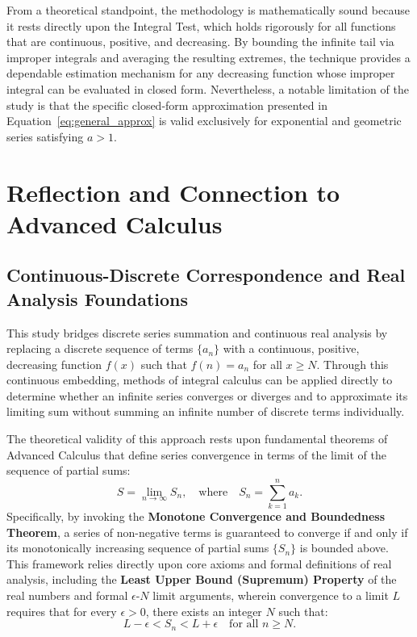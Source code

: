 \documentclass[11pt, a4paper]{article}
\begin{document}
From a theoretical standpoint, the methodology is mathematically sound because it rests directly upon the Integral Test, which holds rigorously for all functions that are continuous, positive, and decreasing. By bounding the infinite tail via improper integrals and averaging the resulting extremes, the technique provides a dependable estimation mechanism for any decreasing function whose improper integral can be evaluated in closed form. Nevertheless, a notable limitation of the study is that the specific closed-form approximation presented in Equation~\eqref{eq:general_approx} is valid exclusively for exponential and geometric series satisfying $a > 1$.

\section{Reflection and Connection to Advanced Calculus}

\subsection{Continuous-Discrete Correspondence and Real Analysis Foundations}

This study bridges discrete series summation and continuous real analysis by replacing a discrete sequence of terms $\{a_{n}\}$ with a continuous, positive, decreasing function $f(x)$ such that $f(n) = a_{n}$ for all $x \ge N$. Through this continuous embedding, methods of integral calculus can be applied directly to determine whether an infinite series converges or diverges and to approximate its limiting sum without summing an infinite number of discrete terms individually.

The theoretical validity of this approach rests upon fundamental theorems of Advanced Calculus that define series convergence in terms of the limit of the sequence of partial sums:
\begin{equation}
    S = \lim_{n \to \infty} S_{n}, \quad \text{where} \quad S_{n} = \sum_{k=1}^{n} a_{k}.
\end{equation}
Specifically, by invoking the \textbf{Monotone Convergence and Boundedness Theorem}, a series of non-negative terms is guaranteed to converge if and only if its monotonically increasing sequence of partial sums $\{S_{n}\}$ is bounded above. This framework relies directly upon core axioms and formal definitions of real analysis, including the \textbf{Least Upper Bound (Supremum) Property} of the real numbers and formal $\epsilon$-$N$ limit arguments, wherein convergence to a limit $L$ requires that for every $\epsilon > 0$, there exists an integer $N$ such that:
\begin{equation}
    L - \epsilon < S_{n} < L + \epsilon \quad \text{for all } n \ge N.
\end{equation}
\end{document}
